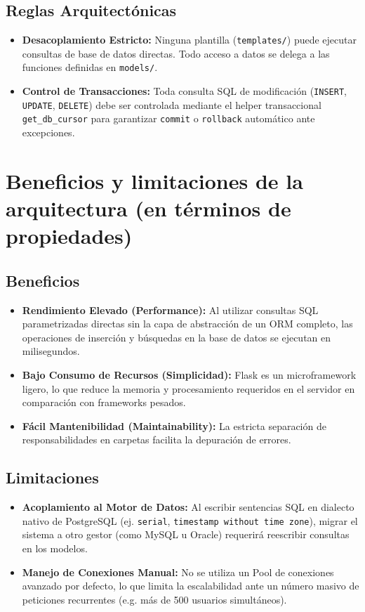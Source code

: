 \subsection{Reglas Arquitectónicas}
\begin{itemize}
    \item \textbf{Desacoplamiento Estricto:} Ninguna plantilla (\texttt{templates/}) puede ejecutar consultas de base de datos directas. Todo acceso a datos se delega a las funciones definidas en \texttt{models/}.
    \item \textbf{Control de Transacciones:} Toda consulta SQL de modificación (\texttt{INSERT}, \texttt{UPDATE}, \texttt{DELETE}) debe ser controlada mediante el helper transaccional \texttt{get\_db\_cursor} para garantizar \texttt{commit} o \texttt{rollback} automático ante excepciones.
\end{itemize}

\section{Beneficios y limitaciones de la arquitectura (en términos de propiedades)}
\label{sec:beneficiosLimitaciones}

\subsection{Beneficios}
\begin{itemize}
    \item \textbf{Rendimiento Elevado (Performance):} Al utilizar consultas SQL parametrizadas directas sin la capa de abstracción de un ORM completo, las operaciones de inserción y búsquedas en la base de datos se ejecutan en milisegundos.
    \item \textbf{Bajo Consumo de Recursos (Simplicidad):} Flask es un microframework ligero, lo que reduce la memoria y procesamiento requeridos en el servidor en comparación con frameworks pesados.
    \item \textbf{Fácil Mantenibilidad (Maintainability):} La estricta separación de responsabilidades en carpetas facilita la depuración de errores.
\end{itemize}

\subsection{Limitaciones}
\begin{itemize}
    \item \textbf{Acoplamiento al Motor de Datos:} Al escribir sentencias SQL en dialecto nativo de PostgreSQL (ej. \texttt{serial}, \texttt{timestamp without time zone}), migrar el sistema a otro gestor (como MySQL u Oracle) requerirá reescribir consultas en los modelos.
    \item \textbf{Manejo de Conexiones Manual:} No se utiliza un Pool de conexiones avanzado por defecto, lo que limita la escalabilidad ante un número masivo de peticiones recurrentes (e.g. más de 500 usuarios simultáneos).
\end{itemize}
